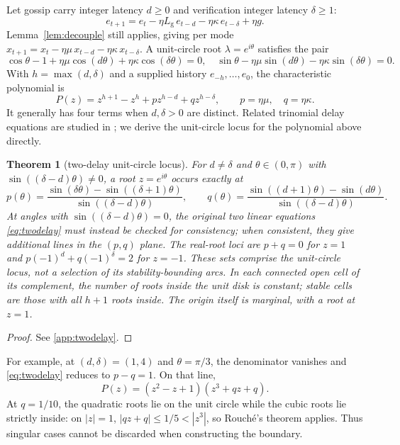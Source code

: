 \documentclass[11pt]{article}
\newtheorem{theorem}{Theorem}
\theoremstyle{definition}
\newcommand{\Lg}{L_{\mathrm g}}
\begin{document}
Let gossip carry integer latency $d\ge0$ and verification integer latency $\delta\ge1$:
\[
  e_{t+1}=e_t-\eta\Lg\,e_{t-d}-\eta\kappa\,e_{t-\delta}+\eta g .
\]
Lemma~\ref{lem:decouple} still applies, giving per mode
$x_{t+1}=x_t-\eta\mu\,x_{t-d}-\eta\kappa\,x_{t-\delta}$. A unit-circle root
$\lambda=e^{i\theta}$ satisfies the pair
\begin{equation}\label{eq:twodelay}
  \cos\theta-1+\eta\mu\cos(d\theta)+\eta\kappa\cos(\delta\theta)=0,\quad
  \sin\theta-\eta\mu\sin(d\theta)-\eta\kappa\sin(\delta\theta)=0.
\end{equation}
With $h=\max(d,\delta)$ and a supplied history $e_{-h},\ldots,e_0$, the characteristic polynomial is
\[
 P(z)=z^{h+1}-z^h+pz^{h-d}+qz^{h-\delta},\qquad p=\eta\mu,\quad q=\eta\kappa.
\]
It generally has four terms when $d,\delta>0$ are distinct. Related trinomial delay equations are
studied in \cite{KipnisNigmatullin}; we derive the unit-circle locus for the polynomial above directly.

\begin{theorem}[two-delay unit-circle locus]\label{thm:twodelay}
For $d\ne\delta$ and $\theta\in(0,\pi)$ with $\sin((\delta-d)\theta)\ne0$, a root
$z=e^{i\theta}$ occurs exactly at
\[
  p(\theta)=\frac{\sin(\delta\theta)-\sin((\delta+1)\theta)}{\sin((\delta-d)\theta)},\qquad
  q(\theta)=\frac{\sin((d+1)\theta)-\sin(d\theta)}{\sin((\delta-d)\theta)}.
\]
At angles with $\sin((\delta-d)\theta)=0$, the original two linear equations
\eqref{eq:twodelay} must instead be checked for consistency; when consistent, they give additional
lines in the $(p,q)$ plane. The real-root loci are $p+q=0$ for $z=1$ and
$p(-1)^d+q(-1)^\delta=2$ for $z=-1$. These sets comprise the unit-circle locus, not a selection
of its stability-bounding arcs. In each connected open cell of its complement, the number of roots
inside the unit disk is constant; stable cells are those with all $h+1$ roots inside.
The origin itself is marginal, with a root at $z=1$.
\end{theorem}
\begin{proof}
See \ref{app:twodelay}.
\end{proof}

For example, at $(d,\delta)=(1,4)$ and $\theta=\pi/3$, the denominator vanishes and
\eqref{eq:twodelay} reduces to $p-q=1$. On that line,
\[
 P(z)=(z^2-z+1)(z^3+qz+q).
\]
At $q=1/10$, the quadratic roots lie on the unit circle while the cubic roots lie strictly inside:
on $|z|=1$, $|qz+q|\le1/5<|z^3|$, so Rouch\'e's theorem applies. Thus singular cases cannot be
discarded when constructing the boundary.
\end{document}
